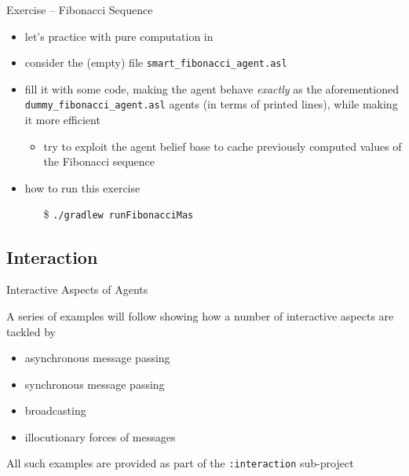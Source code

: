 \documentclass[presentation]{beamer}\mode<presentation>{\usetheme{AMSBolognaFC}}
\begin{document}
\begin{frame}[c, allowframebreaks]{Exercise \theJasonExample{} -- Fibonacci Sequence}
    \begin{itemize}
        \item let's practice with pure computation in \jason{}
        
        \vspace{.3cm}
        
        \item consider the (empty) file \texttt{smart\_fibonacci\_agent.asl}
        
        \vspace{.3cm}
        
        \item fill it with some \jason{} code, making the agent behave \emph{exactly} as the aforementioned \texttt{dummy\_fibonacci\_agent.asl} agents (in terms of printed lines), while making it more efficient
        \begin{itemize}
            \item try to exploit the agent belief base to cache previously computed values of the Fibonacci sequence
        \end{itemize}
        
        \vspace{.3cm}
        
        \item how to run this exercise
        \begin{itemize}
            \item[\$] \texttt{./gradlew run\alert{Fibonacci}Mas}
        \end{itemize}
        
    \end{itemize}
\end{frame}

\subsection{Interaction}

\begin{frame}[c]{Interactive Aspects of \jason{} Agents}

A series of examples will follow showing how a number of interactive aspects are tackled by \jason{}
%
\begin{itemize}
    \item asynchronous message passing
    \item synchronous message passing
    \item broadcasting
    \item illocutionary forces of \jason{} messages
\end{itemize}

\vfill

All such examples are provided as part of the \texttt{:interaction} sub-project

\end{frame} 
\end{document}
